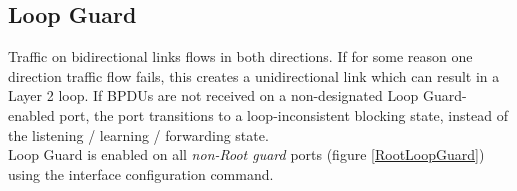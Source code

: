 \subsection{Loop Guard}

Traffic on bidirectional links flows in both directions. If for some reason one direction traffic flow fails, this creates a unidirectional link which can result in a Layer 2 loop. If BPDUs are not received on a non-designated Loop Guard-enabled port, the port transitions to a loop-inconsistent blocking state, instead of the listening / learning / forwarding state. \\

Loop Guard is enabled on all \emph{non-Root guard} ports (figure \ref{RootLoopGuard}) using the  interface configuration command.